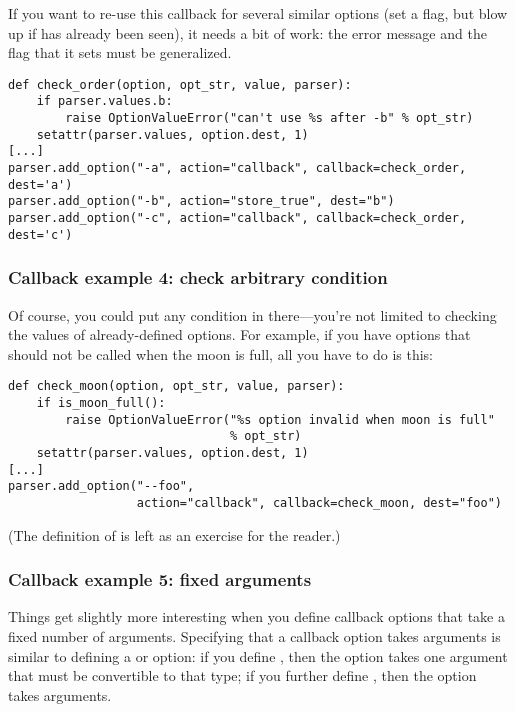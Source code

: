 If you want to re-use this callback for several similar options (set a
flag, but blow up if  has already been seen), it needs a bit of
work: the error message and the flag that it sets must be
generalized.
\begin{verbatim}
def check_order(option, opt_str, value, parser):
    if parser.values.b:
        raise OptionValueError("can't use %s after -b" % opt_str)
    setattr(parser.values, option.dest, 1)
[...]
parser.add_option("-a", action="callback", callback=check_order, dest='a')
parser.add_option("-b", action="store_true", dest="b")
parser.add_option("-c", action="callback", callback=check_order, dest='c')
\end{verbatim}


\subsubsection{Callback example 4: check arbitrary condition\label{optparse-callback-example-4}}

Of course, you could put any condition in there{---}you're not limited
to checking the values of already-defined options.  For example, if
you have options that should not be called when the moon is full, all
you have to do is this:
\begin{verbatim}
def check_moon(option, opt_str, value, parser):
    if is_moon_full():
        raise OptionValueError("%s option invalid when moon is full"
                               % opt_str)
    setattr(parser.values, option.dest, 1)
[...]
parser.add_option("--foo",
                  action="callback", callback=check_moon, dest="foo")
\end{verbatim}

(The definition of  is left as an exercise for the
reader.)


\subsubsection{Callback example 5: fixed arguments\label{optparse-callback-example-5}}

Things get slightly more interesting when you define callback options
that take a fixed number of arguments.  Specifying that a callback
option takes arguments is similar to defining a  or 
option: if you define , then the option takes one argument that
must be convertible to that type; if you further define , then
the option takes  arguments.

